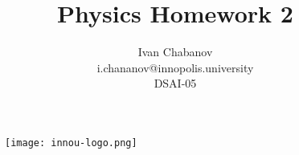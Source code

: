 \begin{titlepage}

    \begin{figure}[t]
        \centering
        \texttt{[image: innou-logo.png]} %
    \end{figure}
    

    \title{Physics Homework 2}
    \author{Ivan Chabanov\\i.chananov@innopolis.university\\DSAI-05}
    \maketitle

\end{titlepage}